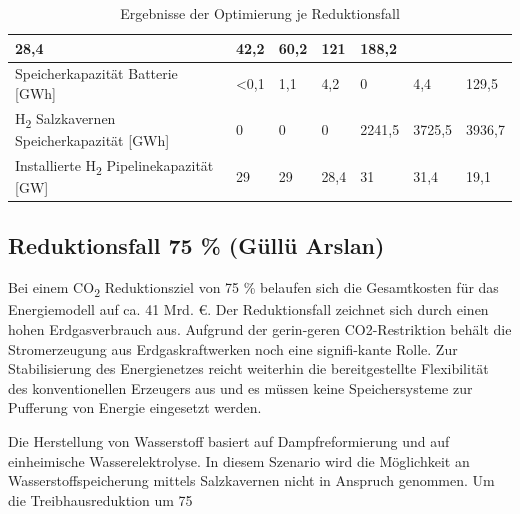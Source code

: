 \begin{table}[!ht]
\begin{tabular}{|l|llllll|}
      \multicolumn{1}{l|}{28,4} &
      \multicolumn{1}{l|}{42,2} &
      \multicolumn{1}{l|}{60,2} &
      \multicolumn{1}{l|}{121} &
      188,2 \\ \hline
    {Speicherkapazität Batterie {[}GWh{]}} &
      \multicolumn{1}{l|}{\textless{}0,1} &
      \multicolumn{1}{l|}{1,1} &
      \multicolumn{1}{l|}{4,2} &
      \multicolumn{1}{l|}{0} &
      \multicolumn{1}{l|}{4,4} &
      129,5 \\ \hline
    {H\textsubscript{2} Salzkavernen Speicherkapazität {[}GWh{]}} &
      \multicolumn{1}{l|}{0} &
      \multicolumn{1}{l|}{0} &
      \multicolumn{1}{l|}{0} &
      \multicolumn{1}{l|}{2241,5} &
      \multicolumn{1}{l|}{3725,5} &
      3936,7 \\ \hline
    {Installierte H\textsubscript{2} Pipelinekapazität {[}GW{]}} &
      \multicolumn{1}{l|}{29} &
      \multicolumn{1}{l|}{29} &
      \multicolumn{1}{l|}{28,4} &
      \multicolumn{1}{l|}{31} &
      \multicolumn{1}{l|}{31,4} &
      19,1 \\ \hline
    \end{tabular}
    \caption{Ergebnisse der Optimierung je Reduktionsfall
    }
    \label{tab:ueberreduktion}
    \end{table}

\subsection{Reduktionsfall 75 \% (Güllü Arslan)}
Bei einem CO\textsubscript{2} Reduktionsziel von 75 \% belaufen sich die Gesamtkosten für das Energiemodell auf ca. 41 Mrd. €. Der Reduktionsfall zeichnet sich durch einen hohen Erdgasverbrauch aus. Aufgrund der gerin-geren CO2-Restriktion behält die Stromerzeugung aus Erdgaskraftwerken noch eine signifi-kante Rolle. Zur Stabilisierung des Energienetzes reicht weiterhin die bereitgestellte Flexibilität des konventionellen Erzeugers aus und es müssen keine Speichersysteme zur Pufferung von Energie eingesetzt werden. 

Die Herstellung von Wasserstoff basiert auf Dampfreformierung und auf einheimische Wasserelektrolyse. In diesem Szenario wird die Möglichkeit an Wasserstoffspeicherung mittels Salzkavernen nicht in Anspruch genommen. Um die Treibhausreduktion um 75 %

